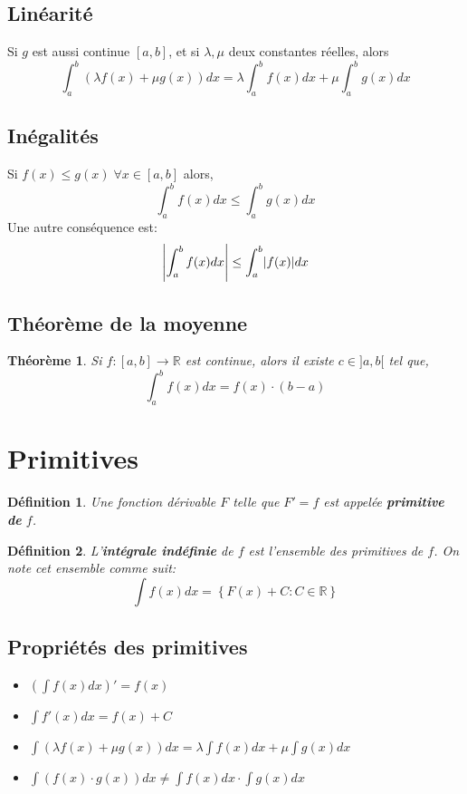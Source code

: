 \documentclass[10pt,a4paper]{book}
\newcommand{\R}{\mathbb{R}}
\DeclarePairedDelimiter\abs{\lvert}{\rvert}
\newtheorem{theorem}{Théorème}[section]
\newtheorem{definition}{Définition}[section]
\begin{document}
\subsection{Linéarité}
Si $g$ est aussi continue $[a,b]$, et si $\lambda, \mu$ deux constantes réelles, alors
\[\int_a^b(\lambda f(x) + \mu g(x))dx = \lambda\int_a^b f(x)dx + \mu \int_a^b g(x)dx\]

\subsection{Inégalités}
Si $f(x) \leq g(x) \; \forall x \in [a,b]$ alors,
\[\int_a^b f(x)dx \leq \int_a^b g(x)dx\]
Une autre conséquence est:
\[\abs*{\int_a^b f(x)dx} \leq \int_a^b \abs*{f(x)}dx\] 

\subsection{Théorème de la moyenne}

\begin{theorem}
Si $f:[a,b]\rightarrow \R$ est continue, alors il existe $c\in ]a,b[$ tel que,
\[\int_a^b f(x)dx = f(x)\cdot (b-a)\]
\end{theorem}

\section{Primitives}

\begin{definition}
Une fonction dérivable $F$ telle que $F'=f$ est appelée \textbf{primitive de }$f$.
\end{definition}
\begin{definition}
L'\textbf{intégrale indéfinie} de $f$ est l'ensemble des primitives de $f$. On note cet ensemble comme suit:
\[\int f(x)dx = \left\lbrace F(x) + C: C\in \R \right\rbrace\]
\end{definition}

\subsection{Propriétés des primitives}

\begin{itemize}
\item $(\int f(x)dx)' = f(x)$
\item $\int f'(x)dx = f(x)+C$
\item $\int(\lambda f(x) + \mu g(x))dx = \lambda \int f(x)dx + \mu \int g(x)dx$
\item $\int (f(x)\cdot g(x))dx \neq \int f(x)dx \cdot \int g(x)dx$
\end{itemize}
\end{document}
